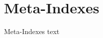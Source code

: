 

\section{Meta-Indexes}\fbeg{}\begin{frame}{}

{\fontsize{20}{23}\selectfont

Meta-Indexes text

}

\end{frame}



